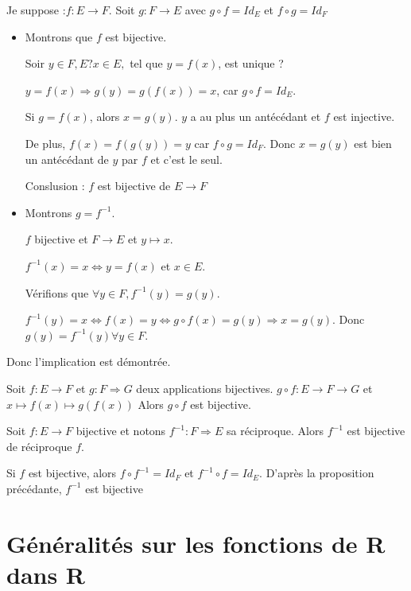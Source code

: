 \documentclass[french]{yLectureNote}
\begin{document}
\begin{myproof}[]
Je suppose :$f:E\rightarrow F$. Soit $g : F\rightarrow E$ avec $g\circ f = Id_E$ et $ f\circ g = Id_F$
\begin{itemize}
 \item Montrons que $f$ est bijective.

Soir $y\in F, E? x\in E,$ tel que $y=f(x)$, est unique ?

$y = f(x) \Rightarrow g(y) = g(f(x)) = x$, car $g\circ f = Id_E$.

Si $g=f(x)$, alors  $x=g(y)$. $y$ a au plus un antécédant et $f$ est injective.

De plus, $f(x) = f(g(y)) = y$ car $f\circ g = Id_F$. Donc $x = g(y)$ est bien un antécédant de $y$ par $f$ et c'est le seul.

Conslusion : $f$ est bijective de $E \rightarrow F$

\item Montrons $g=f^{-1}$.

$f$ bijective et $F \rightarrow E$ et $y \longmapsto x$.

$f^{-1}(x) = x \iff y = f(x)$ et $x\in E$.

Vérifions que $\forall y \in F, f^{-1}(y) = g(y)$.

$f^{-1}(y)=x \iff f(x) = y \iff g\circ f(x) = g(y) \Rightarrow x = g(y)$. Donc $g(y) = f^{-1}(y) \forall y\in F$.
\end{itemize}
Donc l'implication est démontrée.

\end{myproof}
\begin{theorem}[Proposition]
Soit $f : E\rightarrow F$ et $g : F\Rightarrow G$ deux applications bijectives. $g\circ f : E\rightarrow F \rightarrow G$ et $x \longmapsto f(x) \longmapsto g(f(x))$ Alors $g\circ f$ est bijective.
\end{theorem}

\begin{theorem}[Proposition]
Soit $f : E\rightarrow F$ bijective et notons $f^{-1} : F\Rightarrow E$ sa réciproque. Alors $f^{-1}$ est bijective de réciproque $f$.
\end{theorem}
\begin{myproof}[]
Si $f$ est bijective, alors $f\circ f^{-1} = Id_F$ et $f^{-1}\circ f = Id_E$. D'après la proposition précédante, $f^{-1}$ est bijective

\end{myproof}
\section{Généralités sur les fonctions de R dans R}
\end{document}
